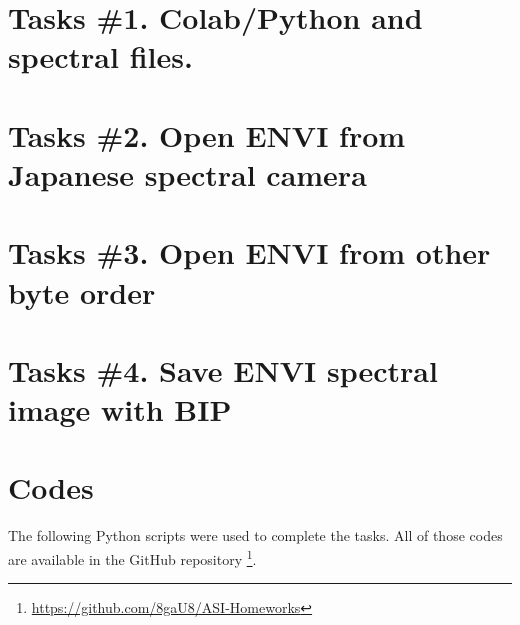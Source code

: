 \section{Tasks \#1. Colab/Python and spectral files.}


\section{Tasks \#2. Open ENVI from Japanese spectral camera}


\section{Tasks \#3. Open ENVI from other byte order}


\section{Tasks \#4. Save ENVI spectral image with BIP}


\section{Codes}

The following Python scripts were used to complete the tasks. All of
those codes are available in the GitHub repository
\footnote{\url{https://github.com/8gaU8/ASI-Homeworks}}.






